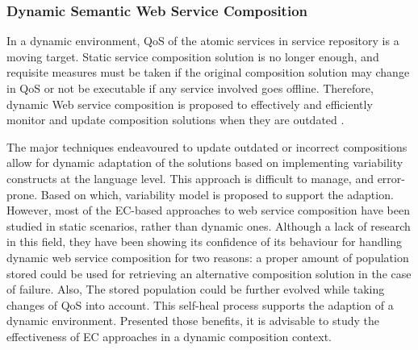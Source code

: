 \subsubsection{Dynamic Semantic Web Service Composition}
In a  dynamic environment, QoS of the atomic services in service repository is a moving target. Static service composition solution is no longer enough, and requisite measures must be taken if the original composition solution may change in QoS or not be executable if any service involved goes offline. Therefore, dynamic Web service composition is proposed to effectively and efficiently monitor and update composition solutions when they are outdated \cite{li2014fault}. 


The major techniques endeavoured to update outdated or incorrect compositions allow for dynamic adaptation of the solutions based on implementing variability constructs at the language level. This approach is difficult to manage, and error-prone.  Based on which, variability model \cite{alferez2014dynamic} is proposed to support the adaption. However, most of the EC-based approaches to web service composition have been studied in static scenarios, rather than dynamic ones. Although a lack of research in this field, they have been showing its confidence of its behaviour for handling dynamic web service composition for two reasons: a proper amount of population stored could be used for retrieving an alternative composition solution in the case of failure. Also, The stored population could be further evolved while taking changes of QoS into account. This self-heal process supports the adaption of a dynamic environment. Presented those benefits, it is advisable to study the effectiveness of EC approaches in a dynamic composition context.

